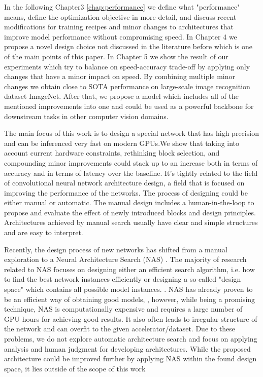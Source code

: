 In the following Chapter3 \ref{chap:performance} we define what "performance" means, define the optimization objective in more detail, and discuss recent modifications for training recipes and minor changes to architectures that improve model performance without compromising speed. In Chapter 4 we propose a novel design choice not discussed in the literature before which is one of the main points of this paper. In Chapter 5 we show the result of our experiments which try to balance on speed-accuracy trade-off by applying only changes that have a minor impact on speed. By combining multiple minor changes we obtain close to SOTA performance on large-scale image recognition dataset ImageNet. After that, we propose a model which includes all of the mentioned improvements into one and could be used as a powerful backbone for downstream tasks in other computer vision domains.

The main focus of this work is to design a special network that has high precision and can be inferenced very fast on modern GPUs.We show that taking into account current hardware constraints, rethinking block selection, and compounding minor improvements could stack up to an increase both in terms of accuracy and in terms of latency over the baseline. It's tightly related to the field of convolutional neural network architecture design, a field that is focused on improving the performance of the networks. The process of designing could be either manual or automatic. The manual design includes a human-in-the-loop to propose and evaluate the effect of newly introduced blocks and design principles. Architectures achieved by manual search usually have clear and simple structures and are easy to interpret. 

Recently, the design process of new networks has shifted from a manual exploration to a Neural Architecture Search (NAS) \cite{real2019_nas1}. The majority of research related to NAS focuses on designing either an efficient search algorithm, i.e. how to find the best network instances efficiently \cite{zoph2018_nasnet} \cite{pham2018_nas_efficient} or designing a so-called "design space" which contains all possible model instances. \cite{radosavovic2020_designing} \cite{liu2018_nas_progressive}. NAS has already proven to be an efficient way of obtaining good models, \cite{tan2019_efficientnet} \cite{lin2020neural_genet} \cite{pham2018_nas_efficient}, however, while being a promising technique, NAS is computationally expensive and requires a large number of GPU hours for achieving good results. It also often leads to irregular structure of the network and can overfit to the given accelerator/dataset. Due to these problems, we do not explore automatic architecture search and focus on applying analysis and human judgment for developing architectures. While the proposed architecture could be improved further by applying NAS within the found design space, it lies outside of the scope of this work




